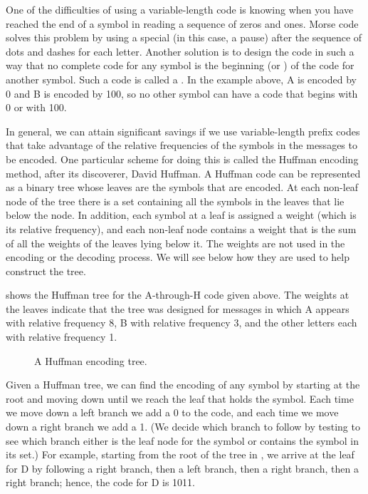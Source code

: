 One of the difficulties of using a variable-length code is knowing when you have reached the end of a symbol in reading a sequence of zeros and ones.
Morse code solves this problem by using a special  (in this case, a pause) after the sequence of dots and dashes for each letter.
Another solution is to design the code in such a way that no complete code for any symbol is the beginning (or ) of the code for another symbol.
Such a code is called a .
In the example above, A is encoded by 0 and B is encoded by 100, so no other symbol can have a code that begins with 0 or with 100.

In general, we can attain significant savings if we use variable-length prefix codes that take advantage of the relative frequencies of the symbols in the messages to be encoded.
One particular scheme for doing this is called the Huffman encoding method, after its discoverer, David Huffman.
A Huffman code can be represented as a binary tree whose leaves are the symbols that are encoded.
At each non-leaf node of the tree there is a set containing all the symbols in the leaves that lie below the node.
In addition, each symbol at a leaf is assigned a weight (which is its relative frequency), and each non-leaf node contains a weight that is the sum of all the weights of the leaves lying below it.
The weights are not used in the encoding or the decoding process.
We will see below how they are used to help construct the tree.

 shows the Huffman tree for the A-through-H code given above.
The weights at the leaves indicate that the tree was designed for messages in which A appears with relative frequency 8, B with relative frequency 3, and the other letters each with relative frequency 1.

\begin{figure}[tb]
	\centering
	
	\caption{
		A Huffman encoding tree.
	}
	\label{Figure 2.18}
\end{figure}

Given a Huffman tree, we can find the encoding of any symbol by starting at the root and moving down until we reach the leaf that holds the symbol.
Each time we move down a left branch we add a 0 to the code, and each time we move down a right branch we add a 1.
(We decide which branch to follow by testing to see which branch either is the leaf node for the symbol or contains the symbol in its set.)
For example, starting from the root of the tree in , we arrive at the leaf for D by following a right branch, then a left branch, then a right branch, then a right branch;
hence, the code for D is 1011.

